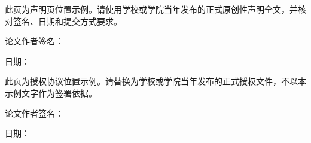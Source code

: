 \clearpage
{}
\thispagestyle{empty}
\thesisbodyfont
此页为声明页位置示例。请使用学校或学院当年发布的正式原创性声明全文，并核对签名、日期和提交方式要求。

\vspace{2\baselineskip}
论文作者签名：\underline{\hspace{4cm}}\par
日期：\underline{\hspace{4cm}}\par

\clearpage
{}
\thispagestyle{empty}
\thesisbodyfont
此页为授权协议位置示例。请替换为学校或学院当年发布的正式授权文件，不以本示例文字作为签署依据。

\vspace{2\baselineskip}
论文作者签名：\underline{\hspace{4cm}}\par
日期：\underline{\hspace{4cm}}\par

